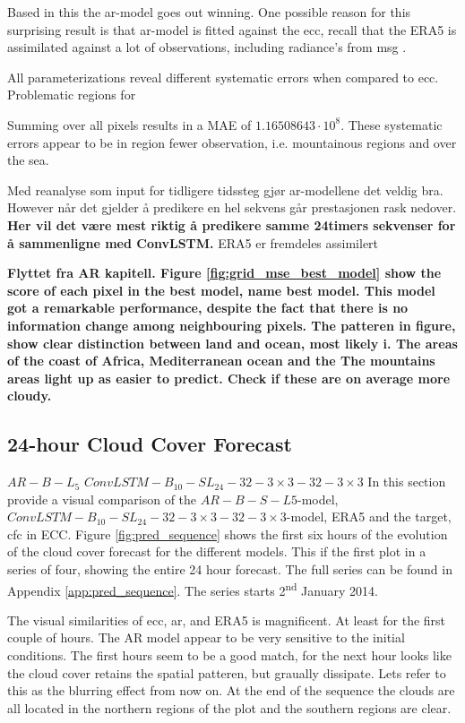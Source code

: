 Based in this the \acrshort{ar}-model goes out winning. One possible reason for this surprising result is that \acrshort{ar}-model is fitted against the \acrshort{ecc}, recall that 
the ERA5 is assimilated against a lot of observations, including radiance's from \acrlong{msg} \cite{ERA52020}.

All parameterizations reveal different systematic errors when compared to \acrshort{ecc}. Problematic regions for 

Summing over all pixels results in a MAE of $1.16508643\cdot10^8$. These systematic errors appear to be in region fewer observation, i.e. mountainous regions and over the sea. %
%

Med reanalyse som input for tidligere tidssteg gjør ar-modellene det veldig bra. However når det gjelder å predikere en hel sekvens går prestasjonen rask nedover. \textbf{Her vil det være mest riktig å predikere samme 24timers sekvenser for å sammenligne med ConvLSTM.} ERA5 er fremdeles assimilert 


\textbf{Flyttet fra AR kapitell. Figure \ref{fig:grid_mse_best_model} show the score of each pixel in the best model, \textbf{name best model}. This model got a remarkable performance, despite the fact that there is no information change among neighbouring pixels. The patteren in figure, show clear distinction between land and ocean, most likely i. The areas of the coast of Africa, Mediterranean ocean and the
The mountains areas light up as easier to predict. \textbf{Check if these are on average more cloudy.}}

\subsection{24-hour Cloud Cover Forecast}
$AR-B-L_5$ $ConvLSTM-B_{10}-SL_{24}-32-3\times3-32-3 \times3$
In this section provide a visual comparison of the $AR-B-S-L5$-model, $ConvLSTM-B_{10}-SL_{24}-32-3\times3-32-3 \times3$-model, ERA5 and the target, \acrshort{cfc} in \acrshort{ECC}. Figure \ref{fig:pred_sequence} shows the first six hours of the evolution of the cloud cover forecast for the different models. This if the first plot in a series of four, showing the entire 24 hour forecast. The full series can be found in Appendix \ref{app:pred_sequence}. The series starts 2\textsuperscript{nd} January 2014.

The visual similarities of \acrshort{ecc}, \acrshort{ar}, and ERA5 is magnificent. At least for the first couple of hours. The AR model appear to be very sensitive to the initial conditions. The first hours seem to be a good match, for the next hour looks like the cloud cover retains the spatial patteren, but graually dissipate. Lets refer to this as the blurring effect from now on. At the end of the sequence the clouds are all located in the northern regions of the plot and the southern regions are clear. 

